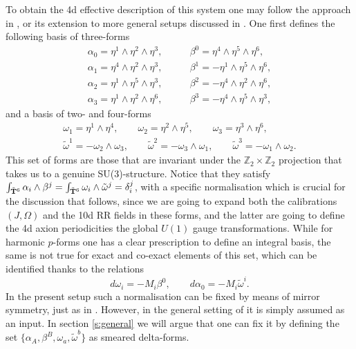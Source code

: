 \documentclass[11pt]{article}
\def\a {\alpha}
\def\b {\beta}
\def\be{\begin{equation}}
\def\ee{\end{equation}}
\def\om{\omega}
\newcommand{\IZ}{\mathbb{Z}}
\begin{document}
To obtain the 4d effective description of this system one may follow the approach in \cite{Gurrieri:2002wz}, or its extension to more general setups discussed in \cite{Grana:2005ny,Kashani-Poor:2006ofe}. One first defines the following basis of three-forms 
\begin{subequations}
\label{alphabetas}
\begin{align}
   \a_0 = \eta^1 \wedge \eta^2 \wedge \eta^3 , & \qquad \beta^0 = \eta^4 \wedge \eta^5 \wedge \eta^6 , \\
   \a_1 = \eta^4 \wedge \eta^2 \wedge \eta^3  , & \qquad \beta^1 = - \eta^1 \wedge \eta^5 \wedge \eta^6 , \\
   \a_2 = \eta^1 \wedge \eta^5 \wedge \eta^3  , & \qquad \beta^2 =  - \eta^4 \wedge \eta^2 \wedge \eta^6 , \\
   \a_3 = \eta^1 \wedge \eta^2 \wedge \eta^6  , & \qquad \beta^3 = - \eta^4 \wedge \eta^5 \wedge \eta^3 ,   
\end{align}
\end{subequations}
and a basis of two- and four-forms
\begin{subequations}
\label{omegas}
\begin{align}
\omega_1 = \eta^1 \wedge \eta^4 , \qquad \omega_2 = \eta^2 \wedge \eta^5 , \qquad \omega_3 = \eta^3 \wedge \eta^6 , \\
\tilde{\omega}^1 = - \omega_2 \wedge \omega_3, \qquad \tilde{\omega}^2 = - \omega_3 \wedge \omega_1, \qquad  \tilde{\omega}^3 = - \omega_1 \wedge \omega_2 .
\end{align}
\end{subequations}
This set of forms are those that are invariant under the $\IZ_2 \times \IZ_2$ projection that takes us to a genuine SU(3)-structure. Notice that they satisfy $\int_{\tilde{\bf T}^6} \a_i \wedge \beta^j = \int_{\tilde{\bf T}^6} \om_i \wedge \tilde{\om}^j = \delta_i^j$, with a specific normalisation which is crucial for the discussion that follows, since we are going to expand both the calibrations $(J, \Omega)$ and the 10d RR fields in these forms, and the latter are going to define the 4d axion periodicities the global $U(1)$ gauge transformations. While for harmonic $p$-forms one has a clear prescription to define an integral basis, the same is not true for exact and co-exact elements of this set, which can be identified thanks to the relations
\be
d\om_i = -M_i \b^0 , \qquad d\a_0 = -M_i \tilde{\om}^i .
\ee
In the present setup such a normalisation can be fixed by means of mirror symmetry, just as in \cite{Gurrieri:2002wz}. However, in the general setting of \cite{Grana:2005ny,Kashani-Poor:2006ofe} it is simply assumed as an input. In section \ref{s:general} we will argue that one can fix it by defining the set $\{\a_A, \b^B, \om_a, \tilde{\om}^b\}$ as smeared delta-forms. 
\end{document}
